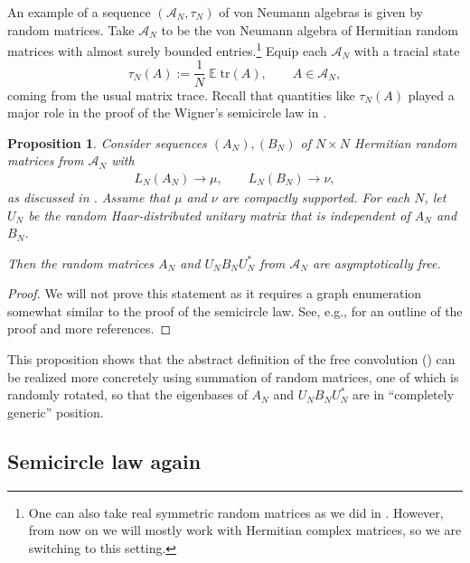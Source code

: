 \documentclass[letterpaper,11pt,oneside,reqno]{amsart}
\numberwithin{equation}{section}
\DeclareMathOperator{\EE}{\mathbb{E}}
\newtheorem{proposition}{Proposition}[section]
\theoremstyle{definition}
\begin{document}
An example of a sequence $(\mathcal{A}_N,\tau_N)$ of von Neumann algebras is 
given by random matrices. Take
$\mathcal{A}_N$ to be the von Neumann algebra of Hermitian
random matrices with almost surely bounded entries.\footnote{One can also take real symmetric random
matrices as we did in . However,
from now on we will mostly work with Hermitian complex matrices, so we are 
switching to this setting.}
Equip each $\mathcal{A}_N$ with a tracial state
\begin{equation*}
	\tau_N(A):=\frac{1}{N} \EE \text{tr}(A),\qquad A\in\mathcal{A}_N,
\end{equation*}
coming from the usual matrix trace. 
Recall that quantities like $\tau_N(A)$ played a major role in the proof of the
Wigner's semicircle law in .

\begin{proposition}\label{prop:asymptotically_free}
	Consider sequences $(A_N), (B_N)$ of $N\times N$ Hermitian random matrices from $\mathcal{A}_N$ with 
	\begin{align*}
		L_N(A_N)\to \mu ,\qquad L_N(B_N)\to \nu,
	\end{align*}
	as discussed in . Assume that $\mu$ and $\nu$ are compactly supported.
	For each $N$, let $U_N$ be the random Haar-distributed unitary matrix 
	that is independent of $A_N$ and $B_N$. 

	Then the random matrices $A_N$ and $U_NB_NU^*_N$ from $\mathcal{A}_N$ 
	are asymptotically free.  
\end{proposition}
\begin{proof}
	We will not prove this statement as it requires a graph enumeration somewhat similar to the proof 
	of the semicircle law. See, e.g., \cite[\S 3.6]{Novak2012FreeLectures} for an outline of the proof
	and more references.
\end{proof}

This proposition shows that the abstract definition of the free convolution ()
can be realized more concretely using summation of random matrices, one of which is randomly rotated, 
so that the eigenbases of $A_N$ and $U_NB_NU^*_N$ are in ``completely generic'' position.


\subsection{Semicircle law again} %
\label{sub:semicircle_law_again}
\end{document}
